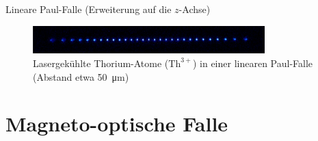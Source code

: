 \documentclass[12pt,xcolor=dvipsnames]{beamer}
\begin{document}
\begin{frame}{Lineare Paul-Falle (Erweiterung auf die $z$-Achse)}
	\vspace{0.2cm}
		
	\begin{figure}[h]
		\centering
		\includegraphics[width=0.8\textwidth]{./figures/29_laser_cooled_ion_chain.jpg}
		\caption{Lasergekühlte Thorium-Atome ($\mathrm{Th}^{3+}$) in einer linearen Paul-Falle (Abstand etwa \SI{50}{\micro\metre}) \cite{campbell}}
	\end{figure}
	
\end{frame}

%
%

\section{Magneto-optische Falle}
\end{document}
